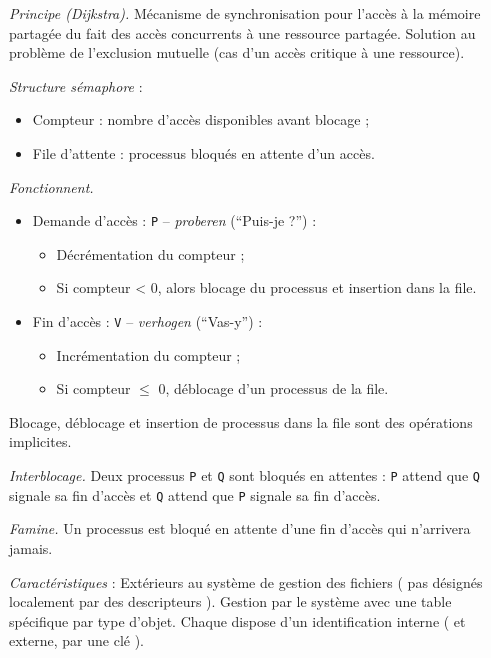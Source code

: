 \documentclass[french]{scrartcl}
\begin{document}
\begin{multicols}{3}
{\emph{Principe (Dijkstra).} Mécanisme de synchronisation pour l'accès à la mémoire partagée du fait des accès concurrents à une ressource partagée. Solution au problème de l'exclusion mutuelle (cas d'un accès critique à une ressource).

\vskip 2pt
\emph{Structure sémaphore} : \begin{itemize}
	\item Compteur : nombre d'accès disponibles avant blocage ;
	\item File d'attente : processus bloqués en attente d'un accès.
\end{itemize}

\vskip 2pt
\emph{Fonctionnent.}\begin{itemize}
	\item Demande d'accès : \lstinline!P! -- \emph{proberen} (``Puis-je ?'') :\begin{itemize}
		\item Décrémentation du compteur ;
		\item Si compteur < 0, alors blocage du processus et insertion dans la file.
	\end{itemize}
	\item Fin d'accès : \lstinline!V! -- \emph{verhogen} (``Vas-y'') :\begin{itemize}
		\item Incrémentation du compteur ;
		\item Si compteur $\leqslant$ 0, déblocage d'un processus de la file.
	\end{itemize}
\end{itemize}
Blocage, déblocage et insertion de processus dans la file sont des opérations implicites.

\vskip 2pt
\emph{Interblocage.} Deux processus \lstinline!P! et \lstinline!Q! sont bloqués en attentes : \lstinline!P! attend que \lstinline!Q! signale sa fin d'accès et \lstinline!Q! attend que \lstinline!P! signale sa fin d'accès.

\vskip 2pt
\emph{Famine.} Un processus est bloqué en attente d'une fin d'accès qui n'arrivera jamais.
}

\clearpage

\vskip 3pt
\emph{Caractéristiques} : Extérieurs au système de gestion des fichiers ( pas désignés localement par des descripteurs ). Gestion par le système avec une table spécifique par type d'objet. Chaque dispose d'un identification interne ( et externe, par une clé ).


\end{multicols}
\end{document}
